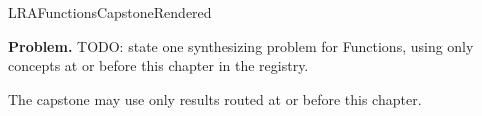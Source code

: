 \ifcsname LRAFunctionsCapstoneRendered\endcsname
\else
\expandafter\gdef\csname LRAFunctionsCapstoneRendered\endcsname{}

\newpage
{}
\label{cap:functions}

\begin{tcolorbox}[
  colback=gray!6,
  colframe=gray!40,
  arc=2pt,
  left=8pt, right=8pt, top=6pt, bottom=6pt,
  title={\small\textbf{Capstone Problem}},
  fonttitle=\small\bfseries
]
\textbf{Problem.}
TODO: state one synthesizing problem for Functions, using only concepts at or
before this chapter in the registry.
\end{tcolorbox}

\begin{remark*}
The capstone may use only results routed at or before this chapter.
\end{remark*}

\clearpage
\fi
